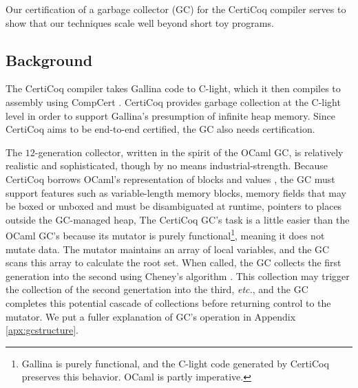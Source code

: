 Our certification of a garbage collector (GC) for the 
CertiCoq compiler serves to show that our techniques 
scale well beyond short toy programs. 


\subsection{Background}
\label{sec:gcbackground}

The CertiCoq compiler \cite{certicoqpaper} takes Gallina code to 
C-light, which it then compiles to assembly using CompCert \cite{leroy:compcert}.
CertiCoq provides garbage collection at
the C-light level in order to support Gallina's presumption of
infinite heap memory. 
Since CertiCoq aims to be end-to-end certified, the GC 
also needs certification.

The $12$-generation collector, written in the spirit of the OCaml GC, 
is relatively realistic and sophisticated, though by no means 
industrial-strength. 
Because CertiCoq borrows OCaml's representation of blocks and 
values \cite{realworldocaml}, the GC must support features such as 
variable-length memory blocks, memory fields that may be boxed 
or unboxed and must be disambiguated at runtime, pointers to places 
outside the GC-managed heap, 
The CertiCoq GC's task is a little easier than the OCaml GC's because 
its mutator is purely functional\footnote{Gallina is purely functional, and
the C-light code generated by CertiCoq preserves this behavior.
OCaml is partly imperative.},
meaning it does not mutate data. The mutator maintains an array of 
local variables, and the GC scans this array to 
calculate the root set. When called, the GC collects the first generation 
into the second using Cheney's algorithm \cite{cheney:gc}.
This collection may trigger the collection of the second genertation 
into the third, \emph{etc.}, and the GC completes this potential cascade 
of collections before returning control to the mutator. We put a 
fuller explanation of GC's operation in Appendix \ref{apx:gcstructure}.

